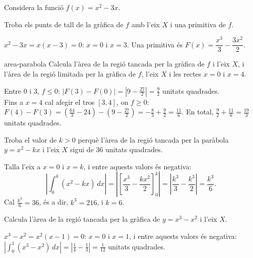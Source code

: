 Considera la funció $f(x)=x^2-3x$.

\begin{apartats}

Troba els punts de tall de la gràfica de $f$ amb l'eix $X$ i una primitiva de $f$.

\begin{solucio}
$x^2-3x=x(x-3)=0$: $x=0$ i $x=3$. Una primitiva és $F(x)=\dfrac{x^3}3-\dfrac{3x^2}2$.
\end{solucio}

\begin{tria}{area-parabola}
Calcula l'àrea de la regió tancada per la gràfica de $f$ i l'eix $X$, i l'àrea de la regió limitada per
la gràfica de $f$, l'eix $X$ i les rectes $x=0$ i $x=4$.

\begin{solucio}
Entre 0 i 3, $f\le0$: $\bigl|F(3)-F(0)\bigr|=\left|9-\frac{27}2\right|=\frac92$ unitats quadrades.\\
Fins a $x=4$ cal afegir el tros $[3,4]$, on $f\ge0$:
$F(4)-F(3)=\left(\frac{64}3-24\right)-\left(9-\frac{27}2\right)=-\frac83+\frac92=\frac{11}6$. En total,
$\frac92+\frac{11}6=\frac{19}3$ unitats quadrades.
\end{solucio}

Troba el valor de $k>0$ perquè l'àrea de la regió tancada per la paràbola $y=x^2-kx$ i l'eix $X$ sigui
de 36 unitats quadrades.

\begin{solucio}
Talla l'eix a $x=0$ i $x=k$, i entre aquests valors és negativa:
\[
\left|\int_0^k(x^2-kx)\,dx\right|=\left|\left[\frac{x^3}3-\frac{kx^2}2\right]_0^k\right|
=\left|\frac{k^3}3-\frac{k^3}2\right|=\frac{k^3}6.
\]
Cal $\frac{k^3}6=36$, és a dir, $k^3=216$, i $k=6$.
\end{solucio}
\end{tria}

\begin{nomesllarg}
Calcula l'àrea de la regió tancada per la gràfica de $y=x^3-x^2$ i l'eix $X$.

\begin{solucio}
$x^3-x^2=x^2(x-1)=0$: $x=0$ i $x=1$, i entre aquests valors és negativa:
$\left|\displaystyle\int_0^1(x^3-x^2)\,dx\right|=\left|\frac14-\frac13\right|=\frac1{12}$ unitats quadrades.
\end{solucio}
\end{nomesllarg}

\end{apartats}
